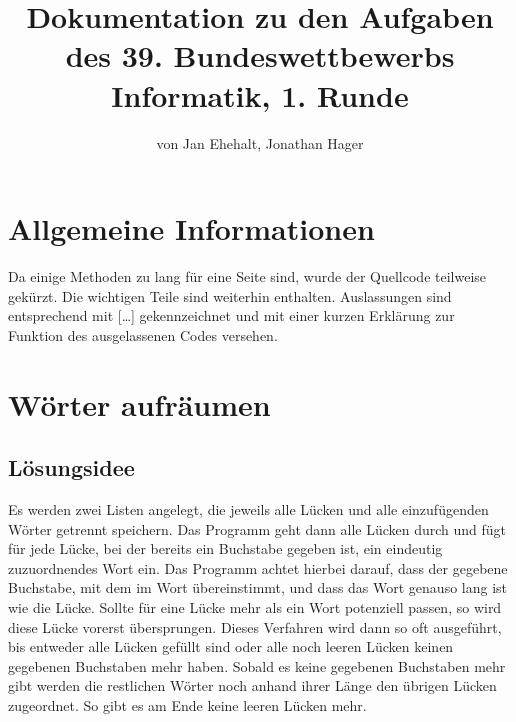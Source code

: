 \documentclass[a4paper, 12pt]{scrartcl}
\title{Dokumentation zu den Aufgaben des 39. Bundeswettbewerbs Informatik, 1. Runde}
\author{von Jan Ehehalt, Jonathan Hager}
\date{}
\begin{document}
\maketitle
\thispagestyle{empty}
\newpage
\tableofcontents
\thispagestyle{empty}
\newpage

\section{Allgemeine Informationen}

Da einige Methoden zu lang für eine Seite sind, wurde der Quellcode teilweise gekürzt. Die wichtigen Teile sind weiterhin enthalten. Auslassungen sind entsprechend mit {\glqq}[\dots]{\grqq} gekennzeichnet und mit einer kurzen Erklärung zur Funktion des ausgelassenen Codes versehen.

\section{Wörter aufräumen}
\subsection{Lösungsidee}
Es werden zwei Listen  angelegt,  die  jeweils  alle  Lücken  und  alle  einzufügenden  Wörter  getrennt speichern.  Das  Programm  geht  dann  alle  Lücken  durch  und  fügt  für  jede  Lücke,  bei  der  bereits  ein Buchstabe gegeben ist, ein eindeutig zuzuordnendes Wort ein. Das Programm achtet hierbei darauf, dass der gegebene Buchstabe, mit dem im Wort übereinstimmt, und dass das Wort genauso lang ist wie die Lücke. Sollte für eine Lücke mehr als ein Wort potenziell passen, so wird diese Lücke vorerst übersprungen.  Dieses  Verfahren  wird  dann  so  oft  ausgeführt,  bis  entweder  alle  Lücken  gefüllt  sind oder alle noch leeren Lücken keinen gegebenen Buchstaben mehr haben. Sobald es keine gegebenen Buchstaben  mehr  gibt werden  die  restlichen  Wörter  noch  anhand ihrer  Länge  den  übrigen  Lücken zugeordnet. So gibt es am Ende keine leeren Lücken mehr.
\end{document}
